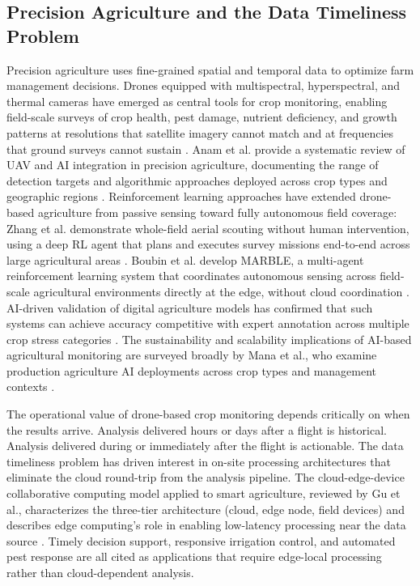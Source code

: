 \subsection{Precision Agriculture and the Data Timeliness Problem}
\label{sec:presion_agri}
Precision agriculture uses fine-grained spatial and temporal data to optimize farm management decisions. Drones equipped with multispectral, hyperspectral, and thermal cameras have emerged as central tools for crop monitoring, enabling field-scale surveys of crop health, pest damage, nutrient deficiency, and growth patterns at resolutions that satellite imagery cannot match and at frequencies that ground surveys cannot sustain \cite{zhang2012uas, habib2024transforming}. Anam et al. provide a systematic review of UAV and AI integration in precision agriculture, documenting the range of detection targets and algorithmic approaches deployed across crop types and geographic regions \cite{anam2024uav}. Reinforcement learning approaches have extended drone-based agriculture from passive sensing toward fully autonomous field coverage: Zhang et al. demonstrate whole-field aerial scouting without human intervention, using a deep RL agent that plans and executes survey missions end-to-end across large agricultural areas \cite{zhang2020whole}. Boubin et al. develop MARBLE, a multi-agent reinforcement learning system that coordinates autonomous sensing across field-scale agricultural environments directly at the edge, without cloud coordination \cite{boubin2022marble}. AI-driven validation of digital agriculture models has confirmed that such systems can achieve accuracy competitive with expert annotation across multiple crop stress categories \cite{romero2023ai}. The sustainability and scalability implications of AI-based agricultural monitoring are surveyed broadly by Mana et al., who examine production agriculture AI deployments across crop types and management contexts \cite{mana2024sustainable}.

The operational value of drone-based crop monitoring depends critically on when the results arrive. Analysis delivered hours or days after a flight is historical. Analysis delivered during or immediately after the flight is actionable. The data timeliness problem has driven interest in on-site processing architectures that eliminate the cloud round-trip from the analysis pipeline. The cloud-edge-device collaborative computing model applied to smart agriculture, reviewed by Gu et al., characterizes the three-tier architecture (cloud, edge node, field devices) and describes edge computing's role in enabling low-latency processing near the data source \cite{gu2025cloudedge}. Timely decision support, responsive irrigation control, and automated pest response are all cited as applications that require edge-local processing rather than cloud-dependent analysis.
